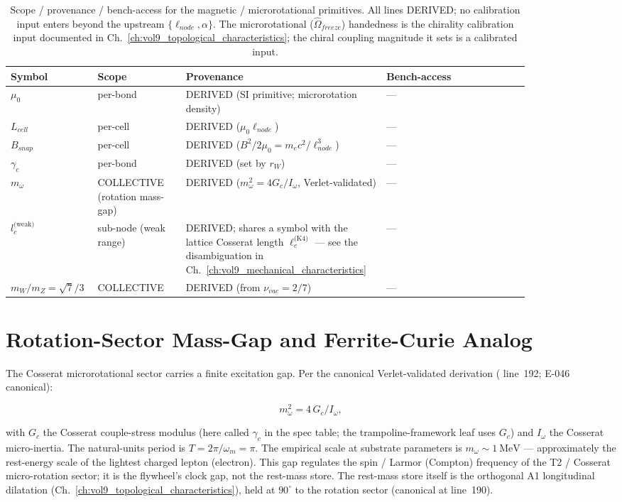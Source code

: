 \begin{table}[htbp]
\centering\footnotesize
\setlength{\tabcolsep}{5pt}
\begin{tabular}{@{}p{0.11\linewidth} p{0.16\linewidth} p{0.32\linewidth} p{0.26\linewidth}@{}}
\toprule
\textbf{Symbol} & \textbf{Scope} & \textbf{Provenance} & \textbf{Bench-access} \\
\midrule
$\mu_0$ & per-bond & DERIVED (SI primitive; microrotation density) & --- \\
$L_{cell}$ & per-cell & DERIVED ($\mu_0\ell_{node}$) & --- \\
$B_{snap}$ & per-cell & DERIVED ($B^2/2\mu_0 = m_e c^2/\ell_{node}^3$) & --- \\
$\gamma_c$ & per-bond & DERIVED (set by $r_W$) & --- \\
$m_\omega$ & COLLECTIVE (rotation mass-gap) & DERIVED ($m_\omega^2 = 4G_c/I_\omega$, Verlet-validated) & --- \\
$l_c^{\text{(weak)}}$ & sub-node (weak range) & DERIVED; shares a symbol with the lattice Cosserat length $\ell_c^{\text{(K4)}}$ --- see the disambiguation in Ch.~\ref{ch:vol9_mechanical_characteristics} & --- \\
$m_W/m_Z = \sqrt{7}/3$ & COLLECTIVE & DERIVED (from $\nu_{vac}=2/7$) & --- \\
\bottomrule
\end{tabular}
\caption{Scope / provenance / bench-access for the magnetic / microrotational primitives. All lines DERIVED; no calibration input enters beyond the upstream $\{\ell_{node}, \alpha\}$. The microrotational ($\hat{\Omega}_{freeze}$) handedness is the chirality calibration input documented in Ch.~\ref{ch:vol9_topological_characteristics}; the chiral coupling magnitude it sets is a calibrated input.}
\label{tab:vol9_magnetic_scope}
\end{table}

\section{Rotation-Sector Mass-Gap and Ferrite-Curie Analog}
\label{sec:vol9_rotation_sector_mass_gap}

The Cosserat microrotational sector carries a finite excitation gap. Per the canonical Verlet-validated derivation ( line~192; E-046 canonical):

\[
m_\omega^2 = 4\, G_c / I_\omega,
\]

with $G_c$ the Cosserat couple-stress modulus (here called $\gamma_c$ in the spec table; the trampoline-framework leaf uses $G_c$) and $I_\omega$ the Cosserat micro-inertia. The natural-units period is $T = 2\pi / \omega_m = \pi$. The empirical scale at substrate parameters is $m_\omega \sim \qty{1}{\mega\electronvolt}$ --- approximately the rest-energy scale of the lightest charged lepton (electron). This gap regulates the spin / Larmor (Compton) frequency of the T2 / Cosserat micro-rotation sector; it is the flywheel's clock gap, not the rest-mass store. The rest-mass store itself is the orthogonal A1 longitudinal dilatation (Ch.~\ref{ch:vol9_topological_characteristics}), held at $90^\circ$ to the rotation sector (canonical at  line~190).

